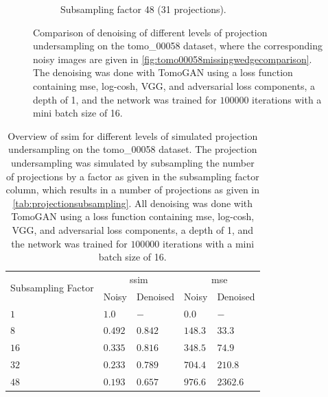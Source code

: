 \begin{figure}
\begin{subfigure}[t]{.45\textwidth}
    \caption{Subsampling factor 48 (31 projections). }
  \end{subfigure}
  \caption[Denoising of four different levels of projection undersampling]{Comparison of denoising of different levels of projection undersampling on the tomo\_00058 dataset, where the corresponding noisy images are given in \cref{fig:tomo00058missingwedgecomparison}. The denoising was done with TomoGAN using a loss function containing \gls{mse}, log-cosh, VGG, and adversarial loss components, a depth of 1, and the network was trained for $100 000$ iterations with a mini batch size of 16. }
  \label{fig:tomo00058missingwedgecomparisondenoised}
\end{figure}


\begin{table}[htbp]
  \centering
  \caption[SSIM for different levels of simulated projection undersampling and corresponding values after denoising]{Overview of \gls{ssim} for different levels of simulated projection undersampling on the tomo\_00058 dataset. The projection undersampling was simulated by subsampling the number of projections by a factor as given in the subsampling factor column, which results in a number of projections as given in \cref{tab:projectionsubsampling}. All denoising was done with TomoGAN using a loss function containing \gls{mse}, log-cosh, VGG, and adversarial loss components, a depth of 1, and the network was trained for $100 000$ iterations with a mini batch size of 16. }
  \label{tab:missingwedgessim}
  \begin{tabular}{lllll}
  \hline
  \multirow{2}{*}{Subsampling Factor} & \multicolumn{2}{c}{\gls{ssim}} & \multicolumn{2}{c}{\gls{mse}}  \\
  {} & Noisy & Denoised & Noisy & Denoised \\
  \hhline{=====}
  $1$  & $1.0$ & $-$ & $0.0$ & $-$ \\
  $8$  & $0.492$ & $0.842$ & $148.3$ & $33.3$ \\
  $16$ & $0.335$ & $0.816$ & $348.5$ & $74.9$ \\
  $32$ & $0.233$ & $0.789$ & $704.4$ & $210.8$ \\
  $48$ & $0.193$ & $0.657$ & $976.6$ & $2362.6$ \\
  \hline
  \end{tabular}
\end{table}

